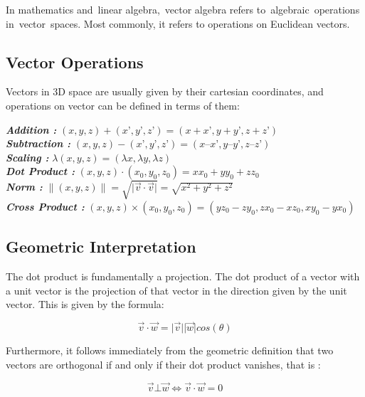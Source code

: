 \documentclass[12pt]{report}
\begin{document}
\hspace{1cm} In mathematics and linear algebra, vector algebra refers to algebraic operations in vector spaces. Most commonly, it refers to operations on Euclidean vectors.

\subsection{Vector Operations}

Vectors in 3D space are usually given by their cartesian coordinates, and operations on vector can be defined in terms of them:

\indent \textbf{\textit{Addition : }} $ (x, y, z) + (x’ , y’ ,z’) = (x + x’, y + y’, z + z’) $  \\
\indent \textbf{\textit{Subtraction : }} $(x, y, z) − (x’ , y’ ,z’) = (x – x’ ,y – y’, z – z’)$ \\
\indent \textbf{\textit{Scaling : }} $ \lambda (x, y, z) = (\lambda x, \lambda y, \lambda z)  $ \\
\indent \textbf{\textit{Dot Product : }}$ (x, y, z) \cdot (x_{0} , y_{0} ,z_{0} ) = x x_{0} + y y_{0} + z z_{0} $ \\
\indent \textbf{\textit{Norm : }} $ \| ( x , y , z ) \| = \sqrt{\vert \overrightarrow{v} \cdot \overrightarrow{v} \vert } = \sqrt{x^2 + y^2 + z^2} $ \\
\indent \textbf{\textit{Cross Product : }} $ (x, y, z ) \times (x_{0} , y_{0} ,z_{0} ) = (yz_{0} − zy_{0} ,zx_{0} − xz_{0} , xy_{0} − yx_{0} ) $ \\

\subsection{Geometric Interpretation}

The dot product is fundamentally a projection. The dot product of a vector with a unit vector is the projection of that vector in the direction given by the unit vector. This is given by the formula:

\[ \overrightarrow{v} \cdot \overrightarrow{w} = \vert \overrightarrow{v} \vert \vert \overrightarrow{w} \vert  cos (\theta) \]


Furthermore, it follows immediately from the geometric definition that two vectors are orthogonal if and only if their dot product vanishes, that is : 

\[ \overrightarrow{v} \bot \overrightarrow{w} \Leftrightarrow \overrightarrow{v} \cdot \overrightarrow{w} = 0 \]
\end{document}
